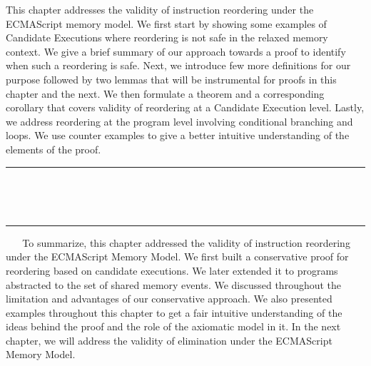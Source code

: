 This chapter addresses the validity of instruction reordering under the ECMAScript memory model.
We first start by showing some examples of Candidate Executions where reordering is not safe in the relaxed memory context.  
We give a brief summary of our approach towards a proof to identify when such a reordering is safe.
Next, we introduce few more definitions for our purpose followed by two lemmas that will be instrumental for proofs in this chapter and the next. 
We then formulate a theorem and a corresponding corollary that covers validity of reordering at a Candidate Execution level. 
Lastly, we address reordering at the program level involving conditional branching and loops.
We use counter examples to give a better intuitive understanding of the elements of the proof.
\ \newline
\ \newline  
\hrule 
\ \newline 
\ \newline 













\ \newline
\ \newline  
\hrule 
\ \newline 
\ \newline 
To summarize, this chapter addressed the validity of instruction reordering under the ECMAScript Memory Model. 
We first built a conservative proof for reordering based on candidate executions.
We later extended it to programs abstracted to the set of shared memory events. 
We discussed throughout the limitation and advantages of our conservative approach. 
We also presented examples throughout this chapter to get a fair intuitive understanding of the ideas behind the proof and the role of the axiomatic model in it.
In the next chapter, we will address the validity of elimination under the ECMAScript Memory Model.